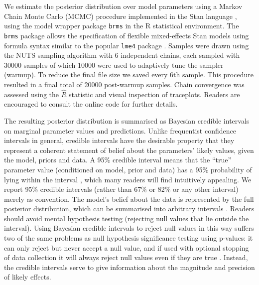 \documentclass[article, 11pt,a4paper,natbib]{apa6}\usepackage[]{graphicx}\usepackage[]{color}
\begin{document}
We estimate the posterior distribution over model parameters using a Markov Chain Monte Carlo (MCMC) procedure implemented in the Stan language \citep[version 2.15.1;][]{standevelopmentteam_stan_2015, hoffman_nouturn_2014}, using the model wrapper package \texttt{brms} \citep[version 1.7.0;][]{burkner_brms:_????-1} in the R statistical environment.
The \texttt{brms} package allows the specification of flexible mixed-effects Stan models using formula syntax similar to the popular \texttt{lme4} package \citep{bates_fitting_2015}.
Samples were drawn using the NUTS sampling algorithm \citep{hoffman_nouturn_2014} with 6 independent chains, each sampled with 30000 samples of which 10000 were used to adaptively tune the sampler (warmup).
To reduce the final file size we saved every 6th sample.
This procedure resulted in a final total of 20000 post-warmup samples.
Chain convergence was assessed using the $\hat R$ statistic \citep{gelman_inference_1992} and visual inspection of traceplots.
Readers are encouraged to consult the online code for further details.

The resulting posterior distribution is summarised as Bayesian credible intervals on marginal parameter values and predictions.
Unlike frequentist confidence intervals in general, credible intervals have the desirable property that they represent a coherent statement of belief about the parameters' likely values, given the model, priors and data.
A 95\% credible interval means that the ``true'' parameter value (conditioned on model, prior and data) has a 95\% probability of lying within the interval \citep[see][for recent discussion on this issue]{morey_fallacy_2015, miller_interpreting_2015,morey_continued_2015}, which many readers will find intuitively appealing.
We report 95\% credible intervals (rather than 67\% or 82\% or any other interval) merely as convention.
The model's belief about the data is represented by the full posterior distribution, which can be summarised into arbitrary intervals \citep[see][p.58 for related discussion]{mcelreath_statistical_2016}.
Readers should avoid mental hypothesis testing (rejecting null values that lie outside the interval).
Using Bayesian credible intervals to reject null values in this way suffers two of the same problems as null hypothesis significance testing using p-values: it can only reject but never accept a null value, and if used with optional stopping of data collection it will always reject null values even if they are true \citep{kruschke_bayesian_2017}.
Instead, the credible intervals serve to give information about the magnitude and precision of likely effects.
\end{document}
